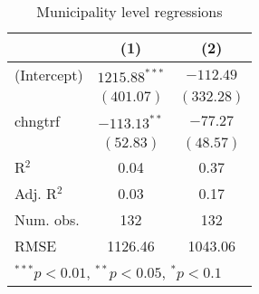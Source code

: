 
\begin{table}
\caption{Municipality level regressions}
\begin{center}
\begin{tabular}{l c c }
\hline
 & (1) & (2) \\
\hline
(Intercept) & $1215.88^{***}$ & $-112.49$  \\
            & $(401.07)$      & $(332.28)$ \\
chngtrf     & $-113.13^{**}$  & $-77.27$   \\
            & $(52.83)$       & $(48.57)$  \\
\hline
R$^2$       & 0.04            & 0.37       \\
Adj. R$^2$  & 0.03            & 0.17       \\
Num. obs.   & 132             & 132        \\
RMSE        & 1126.46         & 1043.06    \\
\hline
\multicolumn{3}{l}{\scriptsize{$^{***}p<0.01$, $^{**}p<0.05$, $^*p<0.1$}}
\end{tabular}
\label{table:coefficients}
\end{center}
\end{table}
